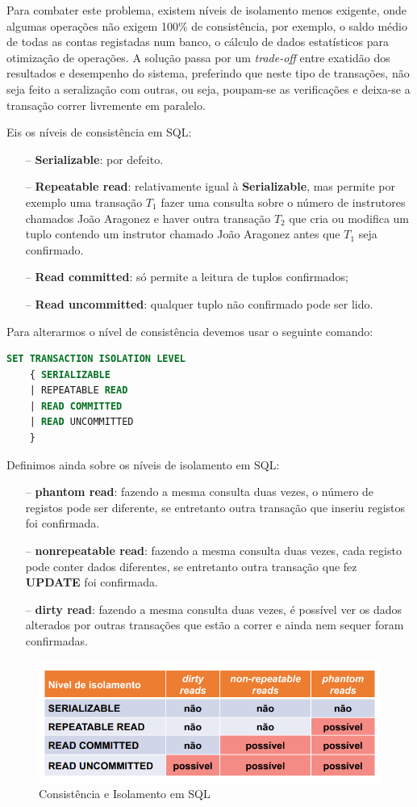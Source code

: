 \documentclass[oneside]{book}
\theoremstyle{definition}
\begin{document}
Para combater este problema, existem níveis de isolamento menos exigente, onde algumas operações não exigem 100\% de consistência, por exemplo, o saldo médio de todas as contas registadas num banco, o cálculo de dados estatísticos para otimização de operações. A solução passa por um \textit{trade-off} entre exatidão dos resultados e desempenho do sistema, preferindo que neste tipo de transações, não seja feito a seralização com outras, ou seja, poupam-se as verificações e deixa-se a transação correr livremente em paralelo.

Eis os níveis de consistência em SQL:
\begin{itemize}
    \itemsep0cm
    \item[--] \textbf{Serializable}: por defeito.
    \item[--] \textbf{Repeatable read}: relativamente igual à \textbf{Serializable}, mas permite por exemplo uma transação $T_1$ fazer uma consulta sobre o número de instrutores chamados João Aragonez e haver outra transação $T_2$ que cria ou modifica um tuplo contendo um instrutor chamado João Aragonez antes que $T_1$ seja confirmado.
    \item[--] \textbf{Read committed}: só permite a leitura de tuplos confirmados;
    \item[--] \textbf{Read uncommitted}: qualquer tuplo não confirmado pode ser lido.
\end{itemize}
Para alterarmos o nível de consistência devemos usar o seguinte comando:
\begin{lstlisting}[language=SQL, morekeywords={REFERENCES, REFRESH, MATERIALIZED, CONCURRENTLY, UNCOMMITTED, COMMITTED, REPEATABLE, SERIALIZABLE}, framesep=8pt, xleftmargin=40pt, framexleftmargin=40pt, frame=tb, framerule=0pt]
SET TRANSACTION ISOLATION LEVEL
    { SERIALIZABLE
    | REPEATABLE READ
    | READ COMMITTED
    | READ UNCOMMITTED
    }
\end{lstlisting}

Definimos ainda sobre os níveis de isolamento em SQL:
\begin{itemize}
    \itemsep0cm
    \item[--] \textbf{phantom read}: fazendo a mesma consulta duas vezes, o número de registos pode ser diferente, se entretanto outra transação que inseriu registos foi confirmada.
    \item[--] \textbf{nonrepeatable read}: fazendo a mesma consulta duas vezes, cada registo pode conter dados diferentes, se entretanto outra transação que fez \textbf{UPDATE} foi confirmada.
    \item[--] \textbf{dirty read}: fazendo a mesma consulta duas vezes, é possível ver os dados alterados por outras transações que estão a correr e ainda nem sequer foram confirmadas.
\end{itemize}

\begin{figure}[H]
    \centering
    \includegraphics[scale = 0.4]{cap3/isolamento_transacoes.png}
    \caption{Consistência e Isolamento em SQL}
\end{figure}
\end{document}
